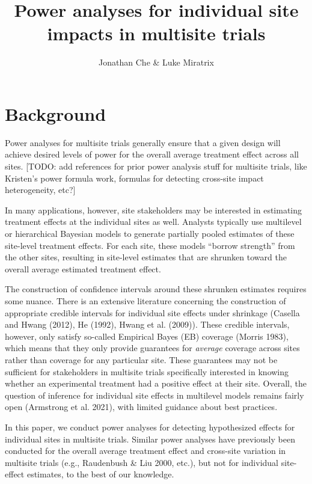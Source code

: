 \documentclass[]{article}
\title{Power analyses for individual site impacts in multisite trials}
\author{Jonathan Che \& Luke Miratrix}
\begin{document}
\maketitle


\section{Background}

Power analyses for multisite trials generally ensure that a given design will achieve desired levels of power for the overall average treatment effect across all sites. [TODO: add references for prior power analysis stuff for multisite trials, like Kristen’s power formula work, formulas for detecting cross-site impact heterogeneity, etc?] 

In many applications, however, site stakeholders may be interested in estimating treatment effects at the individual sites as well. 
Analysts typically use multilevel or hierarchical Bayesian models to generate partially pooled estimates of these site-level treatment effects. 
For each site, these models ``borrow strength'' from the other sites, resulting in site-level estimates that are shrunken toward the overall average estimated treatment effect.

The construction of confidence intervals around these shrunken estimates requires some nuance. 
There is an extensive literature concerning the construction of appropriate credible intervals for individual site effects under shrinkage (Casella and Hwang (2012), He (1992), Hwang et al. (2009)). 
These credible intervals, however, only satisfy so-called Empirical Bayes (EB) coverage (Morris 1983), which means that they only provide guarantees for \textit{average} coverage across sites rather than coverage for any particular site. 
These guarantees may not be sufficient for stakeholders in multisite trials specifically interested in knowing whether an experimental treatment had a positive effect at their site. 
Overall, the question of inference for individual site effects in multilevel models remains fairly open (Armstrong et al. 2021), with limited guidance about best practices.

In this paper, we conduct power analyses for detecting hypothesized effects for individual sites in multisite trials. 
Similar power analyses have previously been conducted for the overall average treatment effect and cross-site variation in multisite trials (e.g., Raudenbush \& Liu 2000, etc.), but not for individual site-effect estimates, to the best of our knowledge.
\end{document}
